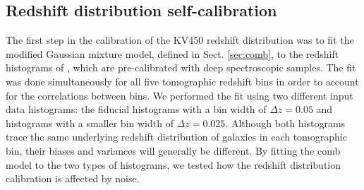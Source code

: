 \documentclass{aa}
\begin{document}
\subsection{Redshift distribution self-calibration}
\label{sec:redshift_calibration}
The first step in the calibration of the KV450 redshift distribution was to fit the modified Gaussian mixture model, defined in Sect. \ref{sec:comb}, to the redshift histograms of \cite{hildebrandt18}, which are pre-calibrated with deep spectroscopic samples. The fit was done simultaneously for all five tomographic redshift bins in order to account for the correlations between bins. We performed the fit using two different input data histograms: the fiducial histograms with a bin width of $\Delta z = 0.05$ and histograms with a smaller bin width of $\Delta z = 0.025$. Although both histograms trace the same underlying redshift distribution of galaxies in each tomographic bin, their biases and variances will generally be different. By fitting the comb model to the two types of histograms, we tested how the redshift distribution calibration is affected by noise. 
\end{document}
